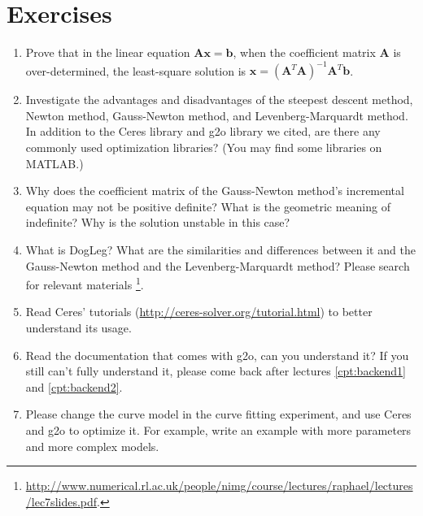 \section*{Exercises}
\begin{enumerate}
    \item Prove that in the linear equation $\mathbf{A} \mathbf{x} = \mathbf{b}$, when the coefficient matrix $\mathbf{A}$ is over-determined, the least-square solution is $\mathbf{x} = (\mathbf{A}^T\mathbf{A})^{-1}\mathbf{A}^T \mathbf{b}$.
    \item Investigate the advantages and disadvantages of the steepest descent method, Newton method, Gauss-Newton method, and Levenberg-Marquardt method. In addition to the Ceres library and g2o library we cited, are there any commonly used optimization libraries? (You may find some libraries on MATLAB.)
    \item Why does the coefficient matrix of the Gauss-Newton method's incremental equation may not be positive definite? What is the geometric meaning of indefinite? Why is the solution unstable in this case?
    \item What is DogLeg? What are the similarities and differences between it and the Gauss-Newton method and the Levenberg-Marquardt method? Please search for relevant materials \footnote{\url{http://www.numerical.rl.ac.uk/people/nimg/course/lectures/raphael/lectures/lec7slides.pdf}. }.
    \item Read Ceres' tutorials (\url{http://ceres-solver.org/tutorial.html}) to better understand its usage.
    \item Read the documentation that comes with g2o, can you understand it? If you still can't fully understand it, please come back after lectures \ref{cpt:backend1} and \ref{cpt:backend2}.
    \item[\optional] Please change the curve model in the curve fitting experiment, and use Ceres and g2o to optimize it. For example, write an example with more parameters and more complex models.
\end{enumerate}